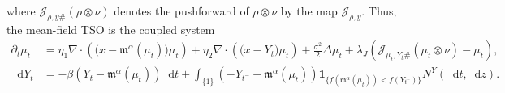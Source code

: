 \documentclass{article}
\newcommand*\der{\mathop{}\!\mathrm{d}}
\numberwithin{equation}{section}
\begin{document}
where $\mathcal{J}_{\rho,y\#}(\rho\otimes\nu)$ denotes the pushforward of
$\rho\otimes\nu$ by the map $\mathcal J_{\rho,y}$. Thus, the mean-field TSO is the coupled system
\begin{align}
\partial_t\mu_t
&=
\eta_1\nabla\cdot
\left(
\bigl(x-\mathfrak{m}^\alpha(\mu_t)\bigr)\mu_t
\right) + \eta_2\nabla\cdot
\left(
\bigl(x- Y_t\bigr)\mu_t
\right) + \frac{\sigma^2}{2}\Delta\mu_t
+\lambda_J
\left(\mathcal J_{\mu_t,Y_t\#}(\mu_t\otimes\nu) - \mu_t
\right), \\
\der Y_t  &= -\beta (Y_t - \mathfrak{m}^{\alpha}(\mu_t))\der t + \int_{\{1\}}( -Y_{t^-} + \mathfrak{m}^{\alpha}(\mu_t))  \mathbf 1_{\{f(\mathfrak{m}^\alpha(\mu_t))<f(Y_{t^-})\}} N^Y(\der t,  \der z).
\end{align}
\end{document}
